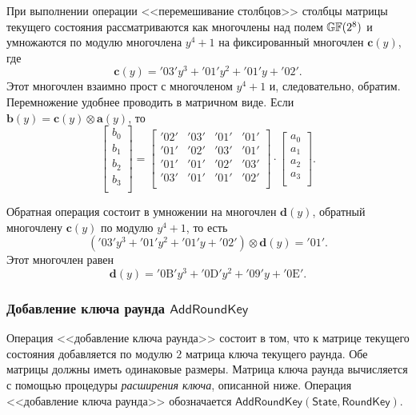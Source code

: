 При выполнении операции <<перемешивание столбцов>> столбцы матрицы текущего состояния рассматриваются как многочлены над полем $\mathbb{GF}(2^8)$ и умножаются по модулю многочлена $y^4 +1$ на фиксированный многочлен $\mathbf{c}(y)$, где
    \[ \mathbf{c}(y) = \mathrm{'03'} y^3 + \mathrm{'01'} y^2 + \mathrm{'01'} y + \mathrm{'02'}. \]
Этот многочлен взаимно прост с многочленом $y^4 + 1$ и, следовательно, обратим. Перемножение удобнее проводить в матричном виде. Если $\mathbf{b}(y) = \mathbf{c}(y) \otimes \mathbf{a}(y)$, то
\[
    \left[ \begin{array}{c}
        b_{0} \\ b_{1} \\ b_{2} \\ b_{3} \\
    \end{array}\right] =  \left[ \begin{array}{cccc}
        \mathrm{'02'} & \mathrm{'03'} & \mathrm{'01'} & \mathrm{'01'} \\
        \mathrm{'01'} & \mathrm{'02'} & \mathrm{'03'} & \mathrm{'01'} \\
        \mathrm{'01'} & \mathrm{'01'} & \mathrm{'02'} & \mathrm{'03'} \\
        \mathrm{'03'} & \mathrm{'01'} & \mathrm{'01'} & \mathrm{'02'} \\
    \end{array} \right] \cdot \left[ \begin{array}{c}
        a_{0} \\ a_{1} \\ a_{2} \\ a_{3} \\
     \end{array} \right].
\]

Обратная операция состоит в умножении на многочлен $\mathbf{d}(y)$, обратный многочлену $\mathbf{c}(y)$ по модулю $y^4 + 1$, то есть
\[
    (\mathrm{'03'} y^{3} + \mathrm{'01'} y^{2} + \mathrm{'01'} y + \mathrm{'02'}) \otimes \mathbf{d}(y) = \mathrm{'01'}.
\]
Этот многочлен равен
\[
    \mathbf{d}(y) = \mathrm{'0B'} y^3 + \mathrm{'0D'} y^2 + \mathrm{'09'} y + \mathrm{'0E'}.
\]


\subsubsection{Добавление ключа раунда $\mathsf{AddRoundKey}$}

Операция <<добавление ключа раунда>> состоит в том, что к матрице текущего состояния добавляется по модулю $2$ матрица ключа текущего раунда. Обе матрицы должны иметь одинаковые размеры. Матрица ключа раунда вычисляется с помощью процедуры \emph{расширения ключа}, описанной ниже. Операция <<добавление ключа раунда>> обозначается $\mathsf{AddRoundKey(State, RoundKey)}$.

